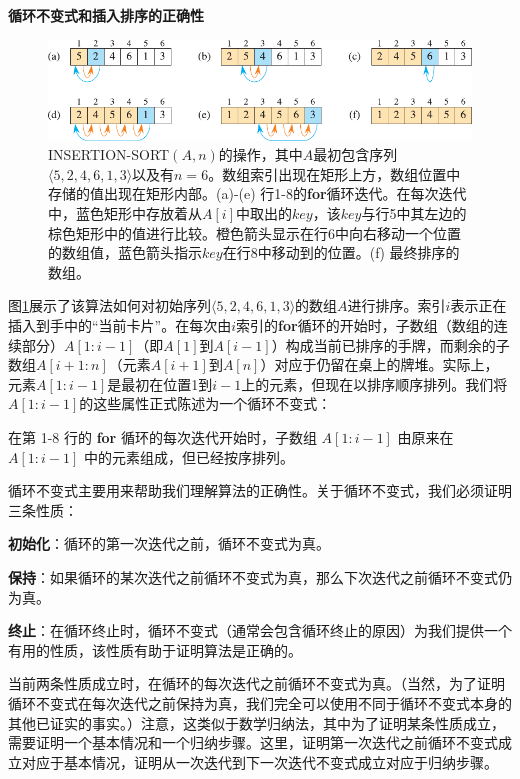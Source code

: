 \documentclass[lang=cn,newtx,10pt,scheme=chinese]{elegantbook}
\begin{document}
\textbf{循环不变式和插入排序的正确性}

\begin{figure}[htbp]
    \centering
    \includegraphics{算法导论第四版插图/第二章/插入排序过程示意图.pdf}
    \caption{INSERTION-SORT$(A,n)$的操作，其中$A$最初包含序列$\langle 5,2,4,6,1,3 \rangle$以及有$n = 6$。数组索引出现在矩形上方，数组位置中存储的值出现在矩形内部。(a)-(e) 行1-8的\textbf{for}循环迭代。在每次迭代中，蓝色矩形中存放着从$A[i]$中取出的$key$，该$key$与行5中其左边的棕色矩形中的值进行比较。橙色箭头显示在行6中向右移动一个位置的数组值，蓝色箭头指示$key$在行8中移动到的位置。(f) 最终排序的数组。}
    \label{fig:插入排序过程示意图}
\end{figure}

图\ref{fig:插入排序过程示意图}展示了该算法如何对初始序列$\langle 5,2,4,6,1,3\rangle$的数组$A$进行排序。索引$i$表示正在插入到手中的``当前卡片''。在每次由$i$索引的\textbf{for}循环的开始时，子数组（数组的连续部分）$A[1:i-1]$（即$A[1]$到$A[i-1]$）构成当前已排序的手牌，而剩余的子数组$A[i+1:n]$（元素$A[i+1]$到$A[n]$）对应于仍留在桌上的牌堆。实际上，元素$A[1:i-1]$是最初在位置1到$i-1$上的元素，但现在以排序顺序排列。我们将$A[1:i-1]$的这些属性正式陈述为一个循环不变式：

\begin{tcolorbox}
在第 1-8 行的 \textbf{for} 循环的每次迭代开始时，子数组 $A[1:i-1]$ 由原来在 $A[1:i-1]$ 中的元素组成，但已经按序排列。
\end{tcolorbox}

循环不变式主要用来帮助我们理解算法的正确性。关于循环不变式，我们必须证明三条性质：

\textbf{初始化}：循环的第一次迭代之前，循环不变式为真。

\textbf{保持}：如果循环的某次迭代之前循环不变式为真，那么下次迭代之前循环不变式仍为真。

\textbf{终止}：在循环终止时，循环不变式（通常会包含循环终止的原因）为我们提供一个有用的性质，该性质有助于证明算法是正确的。

当前两条性质成立时，在循环的每次迭代之前循环不变式为真。（当然，为了证明循环不变式在每次迭代之前保持为真，我们完全可以使用不同于循环不变式本身的其他已证实的事实。）注意，这类似于数学归纳法，其中为了证明某条性质成立，需要证明一个基本情况和一个归纳步骤。这里，证明第一次迭代之前循环不变式成立对应于基本情况，证明从一次迭代到下一次迭代不变式成立对应于归纳步骤。
\end{document}
